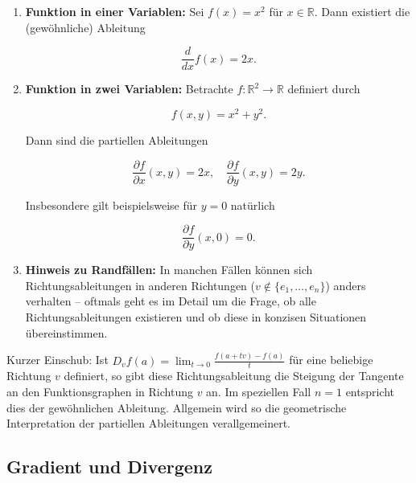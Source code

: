 \begin{beispielbox}
\begin{enumerate}
  \item \textbf{Funktion in einer Variablen:} Sei $ f(x)=x^2 $ für $ x\in \mathbb{R} $. Dann existiert die (gewöhnliche) Ableitung
  

$$
  \frac{d}{dx} f(x)= 2x.
  $$


  
  \item \textbf{Funktion in zwei Variablen:} Betrachte $ f:\mathbb{R}^2 \to \mathbb{R} $ definiert durch
  

$$
  f(x,y)= x^2+y^2.
  $$


  Dann sind die partiellen Ableitungen
  

$$
  \frac{\partial f}{\partial x}(x,y)=2x,\quad \frac{\partial f}{\partial y}(x,y)=2y.
  $$


  Insbesondere gilt beispielsweise für $ y=0 $ natürlich
  

$$
  \frac{\partial f}{\partial y}(x,0)=0.
  $$


  
  \item \textbf{Hinweis zu Randfällen:} In manchen Fällen können sich Richtungsableitungen in anderen Richtungen ($ v\notin\{e_1,\dots,e_n\} $) anders verhalten – oftmals geht es im Detail um die Frage, ob alle Richtungsableitungen existieren und ob diese in konzisen Situationen übereinstimmen.
\end{enumerate}
\end{beispielbox}

\begin{bemerkungbox}
Kurzer Einschub: Ist $ D_v f(a) = \lim_{t\to 0} \frac{f(a+tv)-f(a)}{t} $ für eine beliebige Richtung $ v $ definiert, so gibt diese Richtungsableitung die Steigung der Tangente an den Funktionsgraphen in Richtung $ v $ an. Im speziellen Fall $ n=1 $ entspricht dies der gewöhnlichen Ableitung. Allgemein wird so die geometrische Interpretation der partiellen Ableitungen verallgemeinert.
\end{bemerkungbox}


\subsection*{Gradient und Divergenz}

